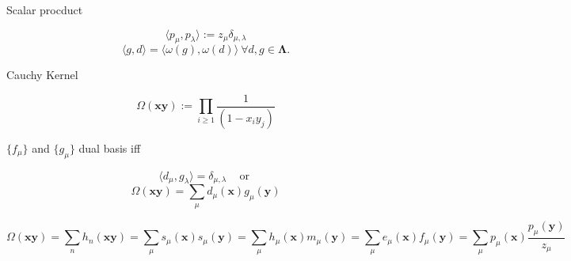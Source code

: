 \documentclass[12pt]{amsart}
\begin{document}
\vspace{-10pt}\begin{mdframed}[linecolor=cyan!20, linewidth=3pt,innertopmargin=8pt]
	\begin{minipage}[t]{7cm}
		\begin{bf}Scalar procduct\end{bf}
		\begin{equation}\langle p_\mu,p_\lambda\rangle:=z_\mu\delta_{\mu,\lambda}\end{equation}
		\begin{equation*}\langle g,d\rangle=\langle \omega(g),\omega(d)\rangle ~ \forall d, g\in\mathbf{\Lambda}.\end{equation*}
	\end{minipage}
	\begin{minipage}[t]{6cm}
		\begin{bf}Cauchy Kernel\end{bf}
		\begin{equation}\Omega(\bm{x}\bm{y}):=\prod_{i\geq 1}\frac{1}{(1-x_iy_j)}\end{equation}
	\end{minipage}
	\begin{minipage}[t]{6cm}
		\begin{bf}$\{f_\mu\}$ and $\{g_\mu\}$ dual basis iff\end{bf}
		\begin{equation*}\langle d_\mu,g_\lambda\rangle=\delta_{\mu,\lambda} \hspace{10pt}\text{ or } \end{equation*}
		\begin{equation*}\Omega(\bm{x}\bm{y})=\sum_\mu d_\mu(\bm{x})g_\mu(\bm{y})\end{equation*}
	\end{minipage}

	\begin{equation}\Omega(\bm{x}\bm{y})=\sum_n h_n(\bm{x}\bm{y})=\sum_\mu s_\mu(\bm{x})s_\mu(\bm{y})=\sum_\mu h_\mu(\bm{x})m_\mu(\bm{y})=\sum_\mu e_\mu(\bm{x})f_\mu(\bm{y})=\sum_\mu p_\mu(\bm{x})\frac{p_\mu(\bm{y})}{z_\mu}
	\end{equation}
\end{mdframed}

\vspace{-10pt}
\end{document}
